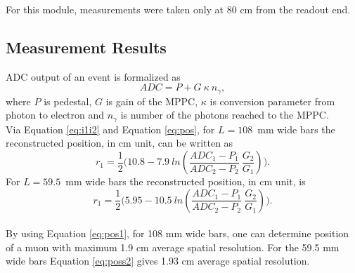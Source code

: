 \documentclass[a4paper]{article}\linespread{1.4}
\begin{document}
For this module, measurements were taken only at 80 cm from the readout end.

\subsection{Measurement Results}
\label{chap:exres} 
ADC output of an event is formalized as
\begin{equation} \label{eq:adc} ADC = P + G~\kappa~n_{\gamma}, \end{equation}
where $P$ is pedestal, $G$ is gain of the MPPC, $\kappa$ is conversion parameter from photon to electron and $n_{\gamma}$ is number of the photons reached to the MPPC.
\\Via Equation \ref{eq:i1i2} and Equation \ref{eq:pos}, for $L=108$~mm wide bars the reconstructed position, in cm unit, can be written as
\begin{equation} \label{eq:pos1} r_{1}=\frac{1}{2} \Big(10.8 - 7.9~ln(\frac{ADC_{1} - P_{1} }{ADC_{2} - P_{2}} ~\frac{G_{2}}{G_{1}})\Big) . \end{equation}
For $L=59.5$~mm wide bars the reconstructed position, in cm unit, is
\begin{equation} \label{eq:poss2} r_{1}=\frac{1}{2} \Big(5.95 - 10.5~ln(\frac{ADC_{1} - P_{1} }{ADC_{2} - P_{2}} ~\frac{G_{2}}{G_{1}})\Big) . \end{equation}
\\By using Equation \ref{eq:pos1}, for 108 mm wide bars, one can determine position of a muon with maximum 1.9 cm average spatial resolution.
For the 59.5 mm wide bars Equation \ref{eq:poss2} gives 1.93 cm average spatial resolution.
\end{document}
